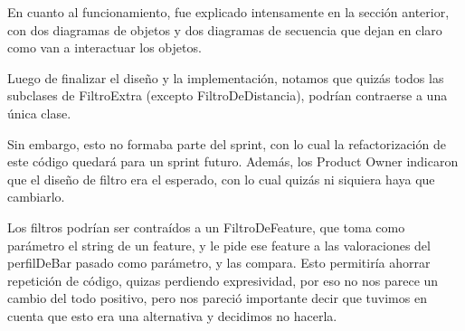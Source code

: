 En cuanto al funcionamiento, fue explicado intensamente en la sección anterior, con dos diagramas de objetos y dos diagramas de secuencia que dejan en claro como van a interactuar los objetos.

Luego de finalizar el diseño y la implementación, notamos que quizás todos las subclases de FiltroExtra (excepto FiltroDeDistancia), podrían contraerse a una única clase. 

Sin embargo, esto no formaba parte del sprint, con lo cual la refactorización de este código quedará para un sprint futuro. Además, los Product Owner indicaron que el diseño de filtro era el esperado, con lo cual quizás ni siquiera haya que cambiarlo.

Los filtros podrían ser contraídos a un FiltroDeFeature, que toma como parámetro el string de un feature, y le pide ese feature a las valoraciones del perfilDeBar pasado como parámetro, y las compara. Esto permitiría ahorrar repetición de código, quizas perdiendo expresividad, por eso no nos parece un cambio del todo positivo, pero nos pareció importante decir que tuvimos en cuenta que esto era una alternativa y decidimos no hacerla.


